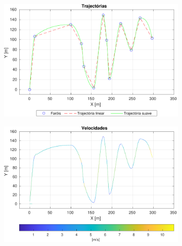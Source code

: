 \documentclass{article}
\begin{document}
\begin{figure}[ht]
     \centering
     \begin{subfigure}[b]{0.49\textwidth}
         \centering
         \includegraphics[width=\textwidth]{figs/trajectories.pdf}
         \caption{}
         \label{fig:planning_trajectory}
     \end{subfigure}
     \hfill
     \begin{subfigure}[b]{0.49\textwidth}
         \centering
         \includegraphics[width=\textwidth]{figs/velocities.pdf}
         \caption{}
         \label{fig:planning_velocities}
     \end{subfigure}
     

\end{figure}
\end{document}
